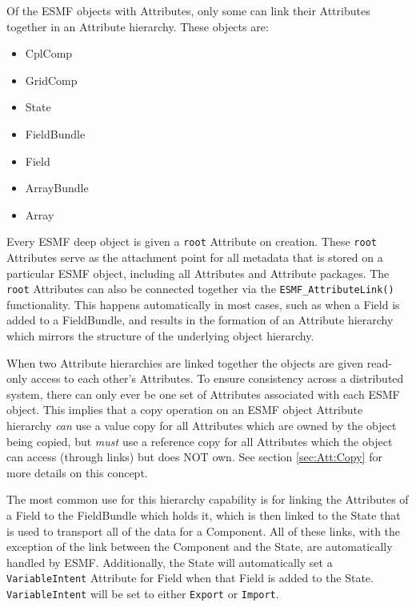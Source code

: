 Of the ESMF objects with Attributes, only some can link their Attributes together in an Attribute hierarchy.  These objects are:

\begin{itemize}
\item CplComp
\item GridComp
\item State
\item FieldBundle
\item Field
\item ArrayBundle
\item Array
\end{itemize}

Every ESMF deep object is given a {\tt root} Attribute on creation.
These {\tt root} Attributes serve as the attachment point for all metadata that 
is stored on a particular ESMF object, including all Attributes and
Attribute packages.  The {\tt root} Attributes can also be connected together via 
the {\tt ESMF\_AttributeLink()} functionality.  This happens automatically in most 
cases, such as when a Field is added to a FieldBundle, and results
in the formation of an Attribute hierarchy which mirrors the structure 
of the underlying object hierarchy.  

When two Attribute hierarchies are linked together 
the objects are given read-only access to each other's Attributes.
To ensure consistency across a distributed system, 
there can only ever be one set of Attributes associated with each ESMF object.  
This implies that a copy operation on an ESMF object Attribute hierarchy {\it can} 
use a value copy for all Attributes which are owned by the object being copied, 
but {\it must} use a reference copy for all Attributes which the object can 
access (through links) but does NOT own. See section \ref{sec:Att:Copy} for more
details on this concept.

The most common use for this hierarchy capability is for linking the Attributes 
of a Field to the FieldBundle which holds it, which is then linked to the 
State that is used to transport all of the data for a Component.  All of 
these links, with the exception of the link between the Component and the 
State, are automatically handled by ESMF. Additionally, the State will 
automatically set a {\tt VariableIntent} Attribute for Field when that Field 
is added to the State.  {\tt VariableIntent} will be set to either 
{\tt Export} or {\tt Import}.

